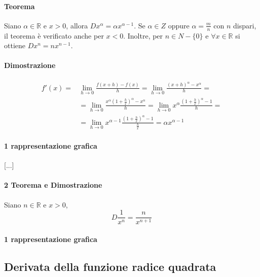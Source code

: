 \documentclass[a4paper,14pt]{extarticle}
\newcommand{\R}{\mathbb{R}}
\begin{document}
\paragraph{Teorema \\} Siano $\alpha \in\R$ e $x > 0$, allora $D x^\alpha = \alpha x^{\alpha-1}$. Se $\alpha \in Z$ oppure $\alpha = \frac{m}{n}$ con $n$ dispari, il teorema è verificato anche per $x<0$. Inoltre, per $n \in N-\{0\}$ e $\forall x \in\R$ si ottiene $D x^n = nx^{n-1}$.
\paragraph{Dimostrazione \\}
\large
\begin{equation} \label{eq_potenza}
\begin{split}
f'(x) = & \lim_{h\to0}\frac{f(x+h)-f(x)}{h} = \lim_{h\to0}\frac{(x+h)^\alpha-x^\alpha}{h} = \\ & = \lim_{h\to0}\frac{x^\alpha(1+\frac{h}{x})^\alpha-x^\alpha}{h} = \lim_{h\to0}x^\alpha\frac{(1+\frac{h}{x})^\alpha-1}{h} = \\ & = \lim_{h\to0}x^{\alpha-1}\frac{(1+\frac{h}{x})^\alpha-1}{\frac{h}{x}}=\alpha x^{\alpha-1}
\end{split}
\end{equation}
\normalsize

\paragraph{1 rappresentazione grafica \\}
[...]

\paragraph{2 Teorema e Dimostrazione \\}  Siano $n \in\R$ e $x > 0$, 
\large
\[ D \frac{1}{x^n} = \frac{n}{x^{n+1}} \]
\normalsize
\paragraph{1 rappresentazione grafica \\}

\subsection{Derivata della funzione radice quadrata}
\end{document}
